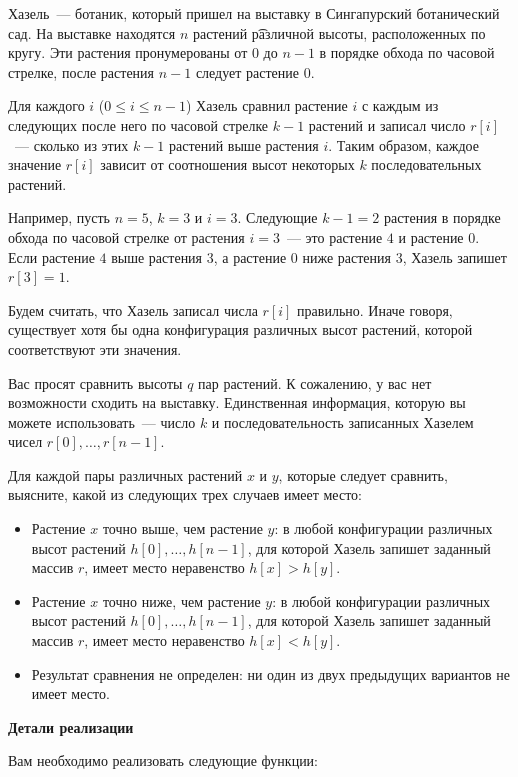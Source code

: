 Хазель~--- ботаник, который пришел на выставку в Сингапурский ботанический сад. На выставке находятся $n$ растений \t{различной высоты}, расположенных по кругу. Эти растения пронумерованы от $0$ до $n - 1$ в порядке обхода по часовой стрелке, после растения $n-1$ следует растение $0$.

Для каждого $i$ ($0 \leq i \leq n-1$) Хазель сравнил растение $i$ с каждым из следующих после него по часовой стрелке  $k-1$ растений и записал число $r[i]$~--- сколько из этих $k-1$ растений выше растения $i$. Таким образом, каждое значение $r[i]$ зависит от соотношения высот некоторых $k$ последовательных растений.

Например, пусть $n=5$, $k=3$ и $i=3$. Следующие $k-1 = 2$ растения в порядке обхода по часовой стрелке от растения $i = 3$~--- это растение $4$ и растение $0$. Если растение $4$ выше растения $3$, а растение $0$ ниже растения $3$, Хазель запишет $r[3] = 1$.

Будем считать, что Хазель записал числа $r[i]$ правильно. Иначе говоря, существует хотя бы одна конфигурация различных высот растений, которой соответствуют эти значения.

Вас просят сравнить высоты $q$ пар растений. К сожалению, у вас нет возможности сходить на выставку. Единственная информация, которую вы можете использовать~--- число $k$ и последовательность записанных Хазелем чисел $r[0], \ldots, r[n-1]$.

Для каждой пары различных растений $x$ и $y$, которые следует сравнить, выясните, какой из следующих трех случаев имеет место:

\begin{itemize}
\item Растение $x$ точно выше, чем растение $y$: в любой конфигурации различных высот растений $h[0], \ldots, h[n - 1]$,  для которой Хазель запишет заданный массив $r$, имеет место неравенство $h[x] > h[y]$.
\item  Растение $x$ точно ниже, чем растение $y$: в любой конфигурации различных высот растений $h[0], \ldots, h[n - 1]$, для которой Хазель запишет заданный массив $r$, имеет место неравенство $h[x] < h[y]$.
\item  Результат сравнения не определен: ни один из двух предыдущих вариантов не имеет место.
\end{itemize}

\textbf{Детали реализации}

Вам необходимо реализовать следующие функции:

